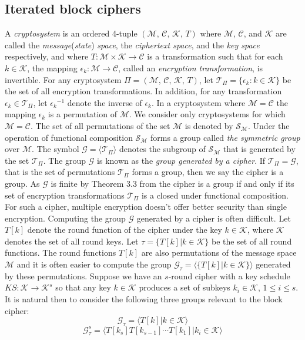 \documentclass[11pt]{amsart}
\newcommand{\KK}{\mathcal{K}}
\newcommand{\MM}{\mathcal{M}}
\newcommand{\GG}{\mathcal{G}}
\newcommand{\TT}{\mathcal{T}}
\newcommand{\sym}{\mathcal{S}}
\newcommand{\CC}{\mathcal{C}}
\begin{document}
\subsection {Iterated block ciphers}
A \emph{cryptosystem} is an ordered 4-tuple  $(\MM,\,\CC,\,\KK,\,T)$  where $\MM$, $\CC$, and $\KK$ are called the \emph {message}(\emph{state}) \emph {space}, the {\it ciphertext space}, and the {\it key space} respectively, and where $T: \MM\times\KK\rightarrow \CC$ is a transformation such that for each $k\in\KK$, the mapping $\epsilon_k:\MM\rightarrow\CC$, called an \emph{encryption transformation}, is invertible.
For any cryptosystem $\Pi=(\MM,\,\CC,\,\KK,\,T)$,  let $\TT_{\Pi}=\{\epsilon_k:k\in\KK\}$ be the set of all encryption transformations. In addition, for any transformation $\epsilon_k\in\TT_{\Pi}$, let ${\epsilon_k}^{-1}$ denote the inverse of $\epsilon_k$.  In a cryptosystem where $\MM=\CC$ the mapping $\epsilon_k$ is a permutation of $\MM$. We consider only cryptosystems for which $\MM = \CC$. The set of all permutations of the set $\MM$ is denoted by $\sym_{\MM}$. Under the operation of functional composition $\sym_{\MM}$ forms a group called \emph{the symmetric group} over $\MM$. 
The symbol $\GG=\langle\TT_{\Pi}\rangle$ denotes the subgroup of $\sym_{\MM}$ that is generated by the set $\TT_{\Pi}$. The group $\GG$ is known as the \emph {group generated by a cipher}. If $\TT_{\Pi} = \GG$, that is the set of permutations $\TT_{\Pi}$ forms a group, then we say the cipher is a group. As $\GG$ is finite by Theorem 3.3 from \cite{G} the cipher is a group if and only if its set of encryption transformations $\TT_{\Pi}$ is a closed under functional composition. For such a cipher, multiple encryption doesn't offer better security than single encryption.
Computing the group $\GG$ generated by a cipher is often difficult. Let $T[k]$ denote the round function of the cipher under the key $k\in \KK$, where $\KK$ denotes the set of all round keys. Let $\tau= \{T[k]\vert k \in \mathcal{K}\}$ be the set of all round functions. The round functions $T[k]$ are also permutations of the message space $\MM$ and it is often easier to compute the group $\GG_{\tau}=\langle\{ T[k]\vert k\in \mathcal{K}\}\rangle$ generated by these permutations. Suppose we have an $s$-round cipher with a key schedule $KS: \KK\rightarrow{\KK^s}$ so that any key $k\in\KK$ produces a set of subkeys $k_i\in \KK$, $1\leq i\leq s$. It is natural then to consider the following three groups relevant to the block cipher:
$$\GG_{\tau}=\langle T[k]\vert k\in\KK\rangle$$
$$\GG_{\tau}^s=\langle T[k_s]T[k_{s-1}]\cdots T[k_1]\vert k_i\in\KK\rangle$$
\end{document}

